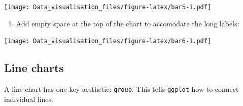 \documentclass[]{book}
\newenvironment{Shaded}{\begin{snugshade}}{\end{snugshade}}
\newcommand{\DataTypeTok}[1]{\textcolor[rgb]{0.13,0.29,0.53}{#1}}
\newcommand{\DecValTok}[1]{\textcolor[rgb]{0.00,0.00,0.81}{#1}}
\newcommand{\FloatTok}[1]{\textcolor[rgb]{0.00,0.00,0.81}{#1}}
\newcommand{\KeywordTok}[1]{\textcolor[rgb]{0.13,0.29,0.53}{\textbf{#1}}}
\newcommand{\NormalTok}[1]{#1}
\newcommand{\OperatorTok}[1]{\textcolor[rgb]{0.81,0.36,0.00}{\textbf{#1}}}
\newcommand{\OtherTok}[1]{\textcolor[rgb]{0.56,0.35,0.01}{#1}}
\newcommand{\StringTok}[1]{\textcolor[rgb]{0.31,0.60,0.02}{#1}}
\providecommand{\tightlist}{%
  \setlength{\itemsep}{0pt}\setlength{\parskip}{0pt}}
\begin{document}
\texttt{[image: Data\_visualisation\_files/figure-latex/bar5-1.pdf]}

\begin{enumerate}
\def\labelenumi{\arabic{enumi}.}
\setcounter{enumi}{1}
\tightlist
\item
  Add empty space at the top of the chart to accomodate the long labels:
\end{enumerate}

\begin{Shaded}
\end{Shaded}

\texttt{[image: Data\_visualisation\_files/figure-latex/bar6-1.pdf]}

\hypertarget{line-charts}{%
\subsection{Line charts}\label{line-charts}}

A line chart has one key aesthetic: \texttt{group}. This tells \texttt{ggplot} how to connect individual lines.
\end{document}
